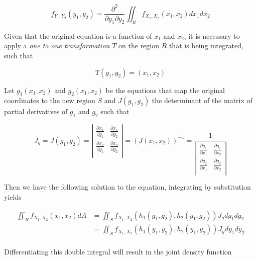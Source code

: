 \documentclass[a4paper,12pt]{article}
\begin{document}
\begin{itemize}
 \begin{equation*}
  f_{Y_1, Y_2} (y_1, y_2) = \frac{\partial^2}{\partial y_1 \partial y_2} \iint_R f_{X_1, X_2} (x_1, x_2)dx_1 dx_2
 \end{equation*}

Given that the original equation is a function of $x_1$ and $x_2$, it is necessary to apply a \emph{one to one transformation}  $T$ on the region $R$ that is being integrated, such that

\begin{equation*}
 T(g_1, g_2) = (x_1, x_2)
\end{equation*}

Let $g_1(x_1, x_2)$ and $g_2(x_1, x_2)$ be the equations that map the original coordinates to the new region $S$ and $J(g_1, g_2)$ the determinant of the matrix of partial derivatives of $g_1$ and $g_2$ such that

\begin{equation*}
 J_g = J(g_1, g_2) = \left |\begin{matrix}
                \frac{\partial x_1}{\partial g_1} &  \frac{\partial x_1}{\partial g_2}\\
                \frac{\partial x_2}{\partial g_1} &  \frac{\partial x_2}{\partial g_2}\\
               \end{matrix}\right |
               =( J(x_1, x_2))^{-1} = \frac{1}{\left |\begin{matrix}
                \frac{\partial g_1}{\partial x_1} &  \frac{\partial g_1}{\partial x_2}\\
                \frac{\partial g_2}{\partial x_1} &  \frac{\partial g_2}{\partial x_2}\\
               \end{matrix}\right |}
\end{equation*}


Then we have the following solution to the equation, integrating by substitution yields

\begin{align*}
  \iint_R f_{X_1, X_2} (x_1, x_2)dA &=  \iint_S f_{X_1, X_2} (h_1(g_1, g_2), h_2(g_1, g_2)) J_g dg_1 dg_2\\
  &= \iint_S f_{X_1, X_2} (h_1(y_1, y_2), h_2(y_1, y_2)) J_g dy_1 dy_2\\
\end{align*}

Differentiating this double integral will result in the joint density function


\end{itemize}
\end{document}
